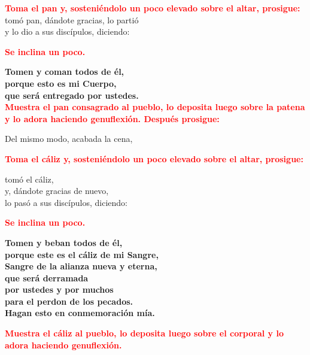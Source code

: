 \documentclass[12pt, letterpaper]{report}
\begin{document}
\large{\bfseries \textcolor{red}{Toma el pan y, sosteni\'endolo un poco elevado sobre el altar, prosigue:}}\newline \\

\Large tom\'o pan, d\'andote gracias, lo parti\'o\\
y lo dio a sus disc\'ipulos, diciendo:\newline

\large{\bfseries \textcolor{red}{Se inclina un poco.}} \newline

\LARGE{ \bfseries{ Tomen y coman todos de \'el,\\
porque esto es mi Cuerpo,\\
que ser\'a entregado por ustedes.}}\newline \\

\large{\bfseries \textcolor{red}{Muestra el pan consagrado al pueblo, lo deposita luego sobre la patena y lo adora haciendo genuflexi\'on. Despu\'es prosigue:}}\newline

\Large Del mismo modo, acabada la cena,\newline

\large{\bfseries \textcolor{red}{Toma el c\'aliz y, sosteni\'endolo un poco elevado sobre el altar, prosigue:}}\newline

\Large tom\'o el c\'aliz,\\
y, d\'andote gracias de nuevo,\\
lo pas\'o a sus disc\'ipulos, diciendo:\newline

\large{\bfseries \textcolor{red}{Se inclina un poco.}}\newline

\LARGE{ \bfseries{ Tomen y beban todos de \'el,\\
porque este es el c\'aliz de mi Sangre,\\
Sangre de la alianza nueva y eterna,\\
que ser\'a derramada\\
por ustedes y por muchos\\
para el perdon de los pecados.\\
Hagan esto en conmemoraci\'on m\'ia.}}\newline

\large{\bfseries \textcolor{red}{Muestra el c\'aliz al pueblo, lo deposita luego sobre el corporal y lo adora haciendo genuflexi\'on.}} \newline
\end{document}

